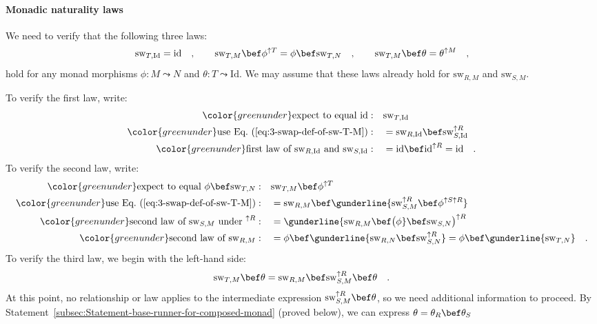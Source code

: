\paragraph{Monadic naturality laws}

We need to verify that the following three laws:
\[
\text{sw}_{T,\text{Id}}=\text{id}\quad,\quad\quad\text{sw}_{T,M}\bef\phi^{\uparrow T}=\phi\bef\text{sw}_{T,N}\quad,\quad\quad\text{sw}_{T,M}\bef\theta=\theta^{\uparrow M}\quad,
\]
hold for any monad morphisms $\phi:M\leadsto N$ and $\theta:T\leadsto\text{Id}$.
We may assume that these laws already hold for $\text{sw}_{R,M}$
and $\text{sw}_{S,M}$.

To verify the first law, write:
\begin{align*}
{\color{greenunder}\text{expect to equal }\text{id}:}\quad & \text{sw}_{T,\text{Id}}\\
{\color{greenunder}\text{use Eq.~(\ref{eq:3-swap-def-of-sw-T-M})}:}\quad & =\text{sw}_{R,\text{Id}}\bef\text{sw}_{S,\text{Id}}^{\uparrow R}\\
{\color{greenunder}\text{first law of }\text{sw}_{R,\text{Id}}\text{ and }\text{sw}_{S,\text{Id}}:}\quad & =\text{id}\bef\text{id}^{\uparrow R}=\text{id}\quad.
\end{align*}
To verify the second law, write:
\begin{align*}
{\color{greenunder}\text{expect to equal }\phi\bef\text{sw}_{T,N}:}\quad & \text{sw}_{T,M}\bef\phi^{\uparrow T}\\
{\color{greenunder}\text{use Eq.~(\ref{eq:3-swap-def-of-sw-T-M})}:}\quad & =\text{sw}_{R,M}\bef\gunderline{\text{sw}_{S,M}^{\uparrow R}\bef\phi^{\uparrow S\uparrow R}}\\
{\color{greenunder}\text{second law of }\text{sw}_{S,M}\text{ under }^{\uparrow R}:}\quad & =\gunderline{\text{sw}_{R,M}\bef\big(\phi}\bef\text{sw}_{S,N}\big)^{\uparrow R}\\
{\color{greenunder}\text{second law of }\text{sw}_{R,M}:}\quad & =\phi\bef\gunderline{\text{sw}_{R,N}\bef\text{sw}_{S,N}^{\uparrow R}}=\phi\bef\gunderline{\text{sw}_{T,N}}\quad.
\end{align*}
To verify the third law, we begin with the left-hand side:
\[
\text{sw}_{T,M}\bef\theta=\text{sw}_{R,M}\bef\text{sw}_{S,M}^{\uparrow R}\bef\theta\quad.
\]
At this point, no relationship or law applies to the intermediate
expression $\text{sw}_{S,M}^{\uparrow R}\bef\theta$, so we need additional
information to proceed. By Statement~\ref{subsec:Statement-base-runner-for-composed-monad}
(proved below), we can express $\theta=\theta_{R}\bef\theta_{S}$
